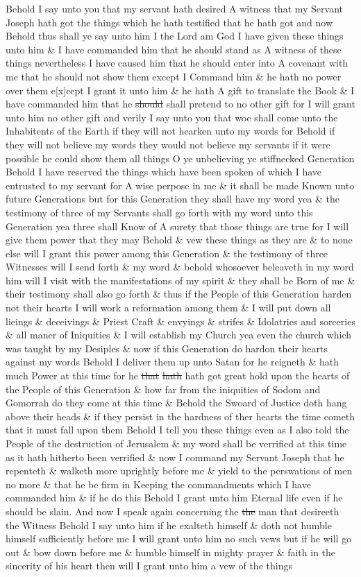 				Behold I say unto you that my servant hath desired A witness that my Servant Joseph hath got the things which he hath testified that he hath got and now Behold thus shall ye say unto him I the Lord am God I have given these things unto him \& I have commanded him that he should stand as A witness of these things nevertheless I have caused him that he should enter into A covenant with me that he should not show them except I Command him \& he hath no power over them e[x]cept I grant it unto him \& he hath A gift to translate the Book \& I have commanded him that he \sout{should} shall pretend to no other gift for I will grant unto him no other gift and verily I say unto you that woe shall come unto the Inhabitents of the Earth if they will not hearken unto my words for Behold if they will not believe my words they would not believe my servants if it were possible he could show them all things O ye unbelieving ye stiffnecked Generation Behold I have reserved the things which have been spoken of which I have entrusted to my servant for A wise perpose in me \& it shall be made Known unto future Generations but for this Generation they shall have my word yea \& the testimony of three of my Servants shall go forth with my word unto this Generation yea three shall Know of A surety that those things are true for I will give them power that they may Behold \& vew these things as they are \& to none else will I grant this power among this Generation \& the testimony of three Witnesses will I send forth \& my word \& behold whosoever beleaveth in my word him will I visit with the manifestations of my spirit \& they shall be Born of me \& their testimony shall also go forth \& thus if the People of this Generation harden not their hearts I will work a reformation among them \& I will put down all lieings \& deceivings \& Priest Craft \& envyings \& strifes \& Idolatries and sorceries \& all maner of Iniquities \& I will establish my Church yea even the church which was taught by my Desiples \& now if this Generation do hardon their hearts against my words Behold I deliver them up unto Satan for he reigneth \& hath much Power at this time for he \sout{that} \sout{hath} hath got great hold upon the hearts of the People of this Generation \& how far from the iniquities of Sodom and Gomorrah do they come at this time \& Behold the Swoard of Justice doth hang above their heads \& if they persist in the hardness of ther hearts the time cometh that it must fall upon them Behold I tell you these things even as I also told the People of the destruction of Jerusalem \& my word shall be verrified at this time as it hath hitherto been verrified \& now I command my Servant Joseph that he repenteth \& walketh more uprightly before me \& yield to the perswations of men no more \& that he be firm in Keeping the commandments which I have commanded him \& if he do this Behold I grant unto him Eternal life even if he should be slain. And now I speak again concerning the \sout{the} man that desireeth the Witness Behold I say unto him if he exalteth himself \& doth not humble himself sufficiently before me I will grant unto him no such vews but if he will go out \& bow down before me \& humble himself in mighty prayer \& faith in the sincerity of his heart then will I grant unto him a vew of the things 